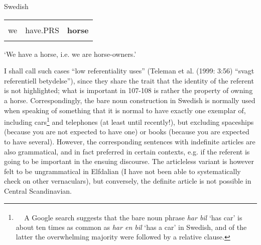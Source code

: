 \begin{listWWNumileveli}
\item 

\begin{styleExample}
\label{bkm:Ref224102890}Swedish

\end{styleExample}

\end{listWWNumileveli}

\begin{tabular}{lll}
\lsptoprule
\multicolumn{3}{l}{Vi

}\\
we & have.PRS & {\bfseries horse}\\
\lspbottomrule
\end{tabular}

\begin{styleTranslation}
‘We have a horse, i.e. we are horse-owners.’

\end{styleTranslation}

\begin{styleBodyTextFirst}
I shall call such cases “low referentiality uses” (Teleman et al. (1999: 3:56) “svagt referentiell betydelse”), since they share the trait that the identity of the referent is not highlighted; what is important in 107{}-108 is rather the property of owning a horse. Correspondingly, the bare noun construction in Swedish is normally used when speaking of something that it is normal to have exactly one exemplar of, including cars\footnote{\textsuperscript{\ \ } A Google search suggests that the bare noun phrase \textit{har bil} ‘has car’ is about ten times as common as \textit{har en bil} ‘has a car’ in Swedish, and of the latter the overwhelming majority were followed by a relative clause. } and telephones (at least until recently!), but excluding spaceships (because you are not expected to have one) or books (because you are expected to have several). However, the corresponding sentences with indefinite articles are also grammatical, and in fact preferred in certain contexts, e.g. if the referent is going to be important in the ensuing discourse. The articleless variant is however felt to be ungrammatical in Elfdalian (I have not been able to systematically check on other vernaculars), but conversely, the definite article is not possible in Central Scandinavian. 

\end{styleBodyTextFirst}

